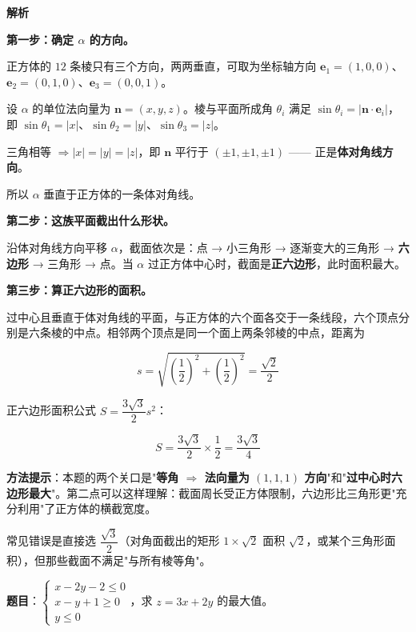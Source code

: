 \textbf{解析}

\textbf{第一步：确定 $\alpha$ 的方向。}

正方体的 $12$ 条棱只有三个方向，两两垂直，可取为坐标轴方向 $\boldsymbol e_1=(1,0,0)$、$\boldsymbol e_2=(0,1,0)$、$\boldsymbol e_3=(0,0,1)$。

设 $\alpha$ 的单位法向量为 $\boldsymbol n=(x,y,z)$。棱与平面所成角 $\theta_i$ 满足 $\sin\theta_i=\left|\boldsymbol n\cdot\boldsymbol e_i\right|$，即 $\sin\theta_1=|x|$、$\sin\theta_2=|y|$、$\sin\theta_3=|z|$。

三角相等 $\Rightarrow|x|=|y|=|z|$，即 $\boldsymbol n$ 平行于 $(\pm1,\pm1,\pm1)$ —— 正是\textbf{体对角线方向}。

所以 $\alpha$ 垂直于正方体的一条体对角线。

\textbf{第二步：这族平面截出什么形状。}

沿体对角线方向平移 $\alpha$，截面依次是：点 → 小三角形 → 逐渐变大的三角形 → \textbf{六边形} → 三角形 → 点。当 $\alpha$ 过正方体中心时，截面是\textbf{正六边形}，此时面积最大。

\textbf{第三步：算正六边形的面积。}

过中心且垂直于体对角线的平面，与正方体的六个面各交于一条线段，六个顶点分别是六条棱的中点。相邻两个顶点是同一个面上两条邻棱的中点，距离为

\[s=\sqrt{\left(\frac12\right)^{2}+\left(\frac12\right)^{2}}=\frac{\sqrt2}2\]

正六边形面积公式 $S=\dfrac{3\sqrt3}2s^{2}$：

\[S=\frac{3\sqrt3}2\times\frac12=\frac{3\sqrt3}4\]


\begin{gktip}
\textbf{方法提示}：本题的两个关口是"\textbf{等角 $\Rightarrow$ 法向量为 $(1,1,1)$ 方向}"和"\textbf{过中心时六边形最大}"。第二点可以这样理解：截面周长受正方体限制，六边形比三角形更"充分利用"了正方体的横截宽度。

常见错误是直接选 $\dfrac{\sqrt3}2$（对角面截出的矩形 $1\times\sqrt2$ 面积 $\sqrt2$，或某个三角形面积），但那些截面不满足"与所有棱等角"。
\end{gktip}

\par\medskip



\textbf{题目}：$\begin{cases}x-2y-2\le0\\ x-y+1\ge0\\ y\le0\end{cases}$，求 $z=3x+2y$ 的最大值。

